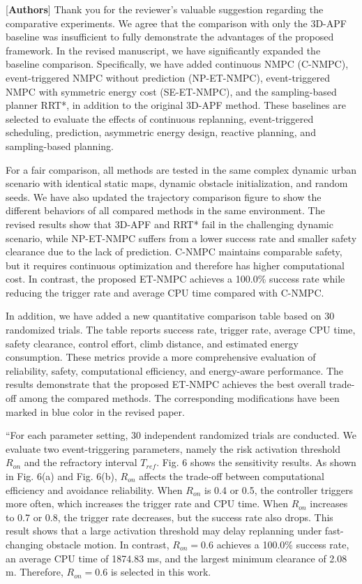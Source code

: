 \documentclass[12pt, twosides]{article}
\theoremstyle{definition}
\begin{document}
\textcolor[rgb]{0.00,0.00,1.00}{[\textbf{Authors}]} Thank you for the reviewer's valuable suggestion regarding the comparative experiments. We agree that the comparison with only the 3D-APF baseline was insufficient to fully demonstrate the advantages of the proposed framework. In the revised manuscript, we have significantly expanded the baseline comparison. Specifically, we have added continuous NMPC (C-NMPC), event-triggered NMPC without prediction (NP-ET-NMPC), event-triggered NMPC with symmetric energy cost (SE-ET-NMPC), and the sampling-based planner RRT*, in addition to the original 3D-APF method. These baselines are selected to evaluate the effects of continuous replanning, event-triggered scheduling, prediction, asymmetric energy design, reactive planning, and sampling-based planning.

For a fair comparison, all methods are tested in the same complex dynamic urban scenario with identical static maps, dynamic obstacle initialization, and random seeds. We have also updated the trajectory comparison figure to show the different behaviors of all compared methods in the same environment. The revised results show that 3D-APF and RRT* fail in the challenging dynamic scenario, while NP-ET-NMPC suffers from a lower success rate and smaller safety clearance due to the lack of prediction. C-NMPC maintains comparable safety, but it requires continuous optimization and therefore has higher computational cost. In contrast, the proposed ET-NMPC achieves a 100.0\% success rate while reducing the trigger rate and average CPU time compared with C-NMPC.

In addition, we have added a new quantitative comparison table based on 30 randomized trials. The table reports success rate, trigger rate, average CPU time, safety clearance, control effort, climb distance, and estimated energy consumption. These metrics provide a more comprehensive evaluation of reliability, safety, computational efficiency, and energy-aware performance. The results demonstrate that the proposed ET-NMPC achieves the best overall trade-off among the compared methods. The corresponding modifications have been marked in blue color in the revised paper.

``For each parameter setting, 30 independent randomized trials are conducted. We evaluate two event-triggering parameters, namely the risk activation threshold $R_{on}$ and the refractory interval $T_{ref}$. Fig. 6 shows the sensitivity results. As shown in Fig. 6(a) and Fig. 6(b), $R_{on}$ affects the trade-off between computational efficiency and avoidance reliability. When $R_{on}$ is 0.4 or 0.5, the controller triggers more often, which increases the trigger rate and CPU time. When $R_{on}$ increases to 0.7 or 0.8, the trigger rate decreases, but the success rate also drops. This result shows that a large activation threshold may delay replanning under fast-changing obstacle motion. In contrast, $R_{on}=0.6$ achieves a 100.0\% success rate, an average CPU time of 1874.83 ms, and the largest minimum clearance of 2.08 m. Therefore, $R_{on}=0.6$ is selected in this work.
\end{document}
